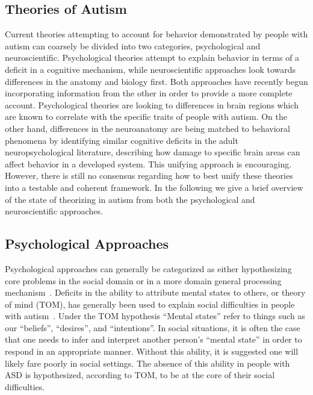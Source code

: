 % 
% 

\subsection{Theories of Autism}
Current theories attempting to account for behavior demonstrated by people with autism can coarsely be divided into two categories, psychological and neuroscientific.  Psychological theories attempt to explain behavior in terms of a deficit in a cognitive mechanism, while neuroscientific approaches look towards differences in the anatomy and biology first.  Both approaches have recently begun incorporating information from the other in order to provide a more complete account.  Psychological theories are looking to differences in brain regions which are known to correlate with the specific traits of people with autism.  On the other hand, differences in the neuroanatomy are being matched to behavioral phenomena by identifying similar cognitive deficits in the adult neuropsychological literature, describing how damage to specific brain areas can affect behavior in a developed system.  This unifying approach is encouraging. However, there is still no consensus regarding how to best unify these theories into a testable and coherent framework.  In the following we give a brief overview of the state of theorizing in autism from both the psychological and neuroscientific approaches.
	
\subsection{Psychological Approaches}
	Psychological approaches can generally be categorized as either hypothesizing core problems in the social domain or in a more domain general processing mechanism~\cite{RefWorks:85}.  Deficits in the ability to attribute mental states to others, or theory of mind (TOM), has generally been used to explain social difficulties in people with autism~\cite{Baron-Cohen:1985:AutismTOM}.  Under the TOM hypothesis ``Mental states'' refer to things such as our ``beliefs'', ``desires'', and ``intentions''.   In social situations, it is often the case that one needs to infer and interpret another person's ``mental state'' in order to respond in an appropriate manner.  Without this ability, it is suggested one will likely fare poorly in social settings.  The absence of this ability in people with ASD is hypothesized, according to TOM, to be at the core of their social difficulties. 

